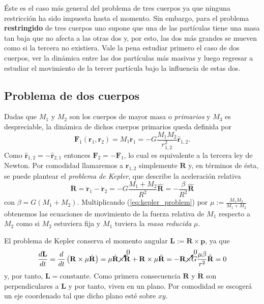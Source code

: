 Éste es el caso más general del problema de tres cuerpos ya que ninguna restricción ha sido impuesta hasta el momento. Sin embargo, para el problema \textbf{restringido} de tres cuerpos uno supone que una de las partículas tiene una masa tan baja que no afecta a las otras dos y, por esto, las dos más grandes se mueven como si la tercera no existiera. Vale la pena estudiar primero el caso de dos cuerpos, ver la dinámica entre las dos partículas más masivas y luego regresar a estudiar el movimiento de la tercer partícula bajo la influencia de estas dos. 

\subsection{Problema de dos cuerpos}
Dadas que $M_1$ y $M_2$ son los cuerpos de mayor masa o \textit{primarios} y $M_3$ es despreciable, la dinámica de dichos cuerpos primarios queda definida por
\begin{equation}
 \mathbf{F}_1(\mathbf{r}_1,\mathbf{r}_2) = M_1 \ddot{\mathbf{r}}_1 = -G \frac{M_1 M_2}{r_{1,2}^2} \hat{\mathbf{r}}_{1,2}.
 \label{eq:2body_eqs_motion}
\end{equation}
Como $\hat{\mathbf{r}}_{1,2} = - \hat{\mathbf{r}}_{2,1}$ entonces $\mathbf{F}_2 = -\mathbf{F}_1$, lo cual es equivalente a la tercera ley de Newton. Por comodidad llamaremos a $\mathbf{r}_{1,2}$ simplemente $\mathbf{R}$ y, en términos de ésta, se puede plantear el \textit{problema de Kepler}, que describe la aceleración relativa
\begin{equation}
 \ddot{\mathbf{R}} = \ddot{\mathbf{r}}_1 - \ddot{\mathbf{r}}_2 = -G \frac{M_1 + M_2}{R^2} \hat{\mathbf{R}} = - \frac{\beta}{R^2}\hat{\mathbf{R}}
 \label{eq:kepler_problem}
\end{equation}
con $\beta = G \left(M_1 + M_2 \right)$. Multiplicando (\ref{eq:kepler_problem}) por $\mu := \frac{M_1 M_2}{M_1+M_2}$ obtenemos las ecuaciones de movimiento de la fuerza relativa de $M_1$ respecto a $M_2$ como si $M_2$ estuviera fija y $M_1$ tuviera la \textit{masa reducida} $\mu$.

El problema de Kepler conserva el momento angular $\mathbf{L} := \mathbf{R} \times \mathbf{p}$, ya que
\begin{equation}
 \frac{d\mathbf{L}}{dt} = \frac{d}{dt}\left(\mathbf{R} \times \mu\dot{\mathbf{R}} \right) = \mu\dot{\mathbf{R}} \cancelto{0}{\times}\dot{\mathbf{R}} + \mathbf{R} \times \mu \ddot{\mathbf{R}} = - \mathbf{R} \cancelto{0}{\times} G\frac{\mu \beta}{r^2}\hat{\mathbf{R}} = 0
\end{equation}
y, por tanto, $\mathbf{L} = \text{constante}$. Como primera consecuencia $\mathbf{R}$ y $\dot{\mathbf{R}}$ son perpendiculares a $\mathbf{L}$ y por tanto, viven en un plano. Por comodidad se escogerá un eje coordenado tal que dicho plano esté sobre $xy$. 

